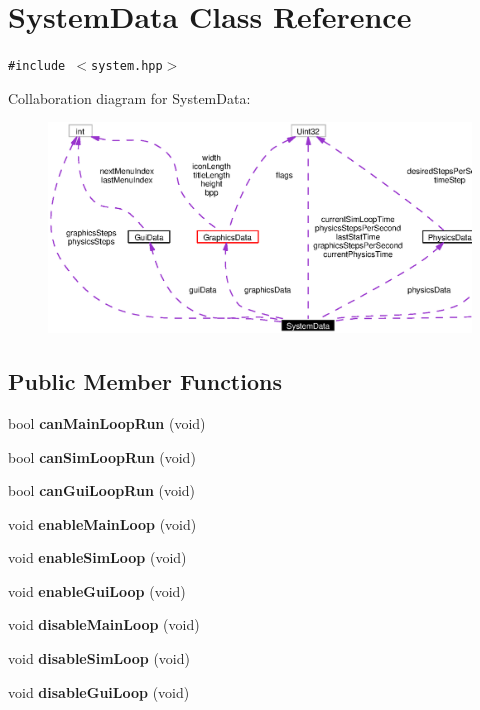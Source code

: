 \section{System\-Data Class Reference}
\label{classSystemData}
{\tt \#include $<$system.hpp$>$}

Collaboration diagram for System\-Data:\begin{figure}[H]
\begin{center}
\leavevmode
\includegraphics[width=397pt]{classSystemData__coll__graph}
\end{center}
\end{figure}
\subsection*{Public Member Functions}
\begin{CompactItemize}
\item 
bool {\bf can\-Main\-Loop\-Run} (void)
\item 
bool {\bf can\-Sim\-Loop\-Run} (void)
\item 
bool {\bf can\-Gui\-Loop\-Run} (void)
\item 
void {\bf enable\-Main\-Loop} (void)
\item 
void {\bf enable\-Sim\-Loop} (void)
\item 
void {\bf enable\-Gui\-Loop} (void)
\item 
void {\bf disable\-Main\-Loop} (void)
\item 
void {\bf disable\-Sim\-Loop} (void)
\item 
void {\bf disable\-Gui\-Loop} (void)
\end{CompactItemize}
